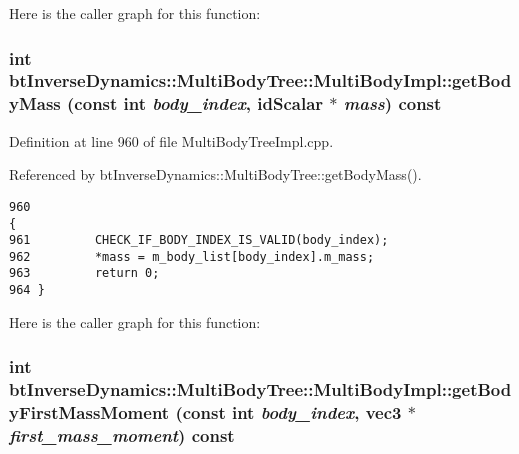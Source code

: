 Here is the caller graph for this function:\hypertarget{classbt_inverse_dynamics_1_1_multi_body_tree_1_1_multi_body_impl_979fa0066a08422f5b8c1c32e02de8a7}{
\subsubsection[getBodyMass]{\setlength{\rightskip}{0pt plus 5cm}int btInverseDynamics::MultiBodyTree::MultiBodyImpl::getBodyMass (const int {\em body\_\-index}, \/  idScalar $\ast$ {\em mass}) const}}
\label{classbt_inverse_dynamics_1_1_multi_body_tree_1_1_multi_body_impl_979fa0066a08422f5b8c1c32e02de8a7}


 

Definition at line 960 of file MultiBodyTreeImpl.cpp.

Referenced by btInverseDynamics::MultiBodyTree::getBodyMass().

\begin{Code}\begin{verbatim}960                                                                                       {
961         CHECK_IF_BODY_INDEX_IS_VALID(body_index);
962         *mass = m_body_list[body_index].m_mass;
963         return 0;
964 }
\end{verbatim}
\end{Code}




Here is the caller graph for this function:\hypertarget{classbt_inverse_dynamics_1_1_multi_body_tree_1_1_multi_body_impl_67093942de357aa1b3013ed4c342c1de}{
\subsubsection[getBodyFirstMassMoment]{\setlength{\rightskip}{0pt plus 5cm}int btInverseDynamics::MultiBodyTree::MultiBodyImpl::getBodyFirstMassMoment (const int {\em body\_\-index}, \/  {\bf vec3} $\ast$ {\em first\_\-mass\_\-moment}) const}}
\label{classbt_inverse_dynamics_1_1_multi_body_tree_1_1_multi_body_impl_67093942de357aa1b3013ed4c342c1de}


